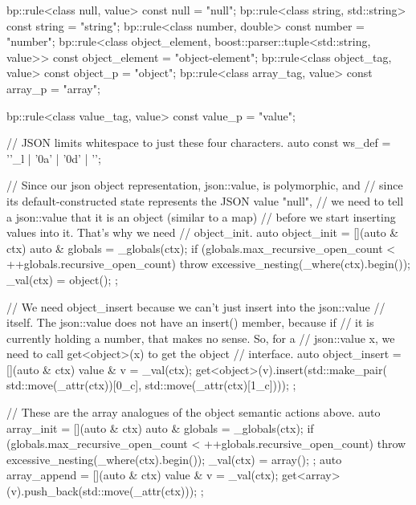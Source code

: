 \begin{code}
{    bp::rule<class null, value> const null = "null";
    bp::rule<class string, std::string> const string = "string";
    bp::rule<class number, double> const number = "number";
    bp::rule<class object_element, boost::parser::tuple<std::string, value>> const
        object_element = "object-element";
    bp::rule<class object_tag, value> const object_p = "object";
    bp::rule<class array_tag, value> const array_p = "array";

    bp::rule<class value_tag, value> const value_p = "value";



    // JSON limits whitespace to just these four characters.
    auto const ws_def = ''_l | '\x0a' | '\x0d' | '';

    // Since our json object representation, json::value, is polymorphic, and
    // since its default-constructed state represents the JSON value "null",
    // we need to tell a json::value that it is an object (similar to a map)
    // before we start inserting values into it.  That's why we need
    // object_init.
    auto object_init = [](auto & ctx) {
        auto & globals = _globals(ctx);
        if (globals.max_recursive_open_count < ++globals.recursive_open_count)
            throw excessive_nesting(_where(ctx).begin());
        _val(ctx) = object();
    };

    // We need object_insert because we can't just insert into the json::value
    // itself.  The json::value does not have an insert() member, because if
    // it is currently holding a number, that makes no sense.  So, for a
    // json::value x, we need to call get<object>(x) to get the object
    // interface.
    auto object_insert = [](auto & ctx) {
        value & v = _val(ctx);
        get<object>(v).insert(std::make_pair(
            std::move(_attr(ctx))[0_c], std::move(_attr(ctx)[1_c])));
    };

    // These are the array analogues of the object semantic actions above.
    auto array_init = [](auto & ctx) {
        auto & globals = _globals(ctx);
        if (globals.max_recursive_open_count < ++globals.recursive_open_count)
            throw excessive_nesting(_where(ctx).begin());
        _val(ctx) = array();
    };
    auto array_append = [](auto & ctx) {
        value & v = _val(ctx);
        get<array>(v).push_back(std::move(_attr(ctx)));
    };

}
\end{code}
